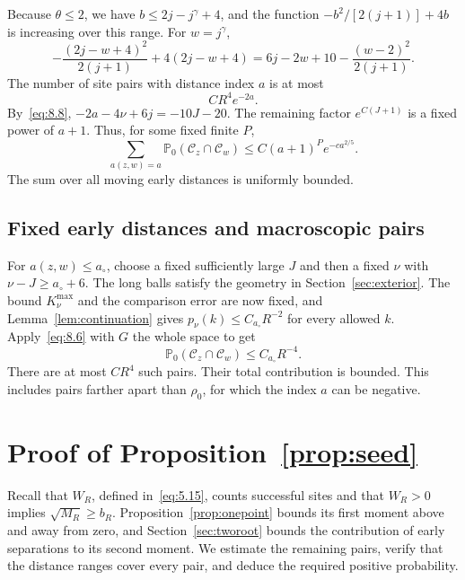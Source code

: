 \documentclass[11pt,letterpaper,reqno]{amsart}
\numberwithin{equation}{section}
\theoremstyle{remark}
\begin{document}
Because $\theta\le2$, we have $b\le2j-j^\gamma+4$, and the function
$-b^2/[2(j+1)]+4b$ is increasing over this range. For $w=j^\gamma$,
\begin{equation}\label{eq:8.25}
-\frac{(2j-w+4)^2}{2(j+1)}+4(2j-w+4)
=6j-2w+10-\frac{(w-2)^2}{2(j+1)}.
\end{equation}
The number of site pairs with distance index $a$ is at most
\begin{equation}\label{eq:8.26}
CR^4e^{-2a}.
\end{equation}
By~\eqref{eq:8.8}, $-2a-4\nu+6j=-10J-20$. The remaining factor $e^{C(J+1)}$ is a fixed power of $a+1$. Thus, for some fixed finite $P$,
\begin{equation}\label{eq:8.27}
\sum_{a(z,w)=a}\mathbb P_0(\mathcal C_z\cap\mathcal C_w)
\le C(a+1)^P e^{-c a^{2/5}}.
\end{equation}
The sum over all moving early distances is uniformly bounded.

\subsection{Fixed early distances and macroscopic pairs}\label{sec:far}
For $a(z,w)\le a_\circ$, choose a fixed sufficiently large $J$ and then a fixed $\nu$ with $\nu-J\ge a_\circ+6$. The long balls satisfy the geometry in Section~\ref{sec:exterior}. The bound $K_\nu^{\max}$ and the comparison error are now fixed, and Lemma~\ref{lem:continuation} gives
$p_\nu(k)\le C_{a_\circ}R^{-2}$ for every allowed $k$. Apply~\eqref{eq:8.6} with $G$ the whole space to get
\begin{equation}\label{eq:8.28}
\mathbb P_0(\mathcal C_z\cap\mathcal C_w)
\le C_{a_\circ}R^{-4}.
\end{equation}
There are at most $CR^4$ such pairs. Their total contribution is bounded. This includes pairs farther apart than $\rho_0$, for which the index $a$ can be negative.


\section{Proof of Proposition~\ref{prop:seed}}\label{sec:second}
Recall that $W_R$, defined in~\eqref{eq:5.15}, counts successful sites and that $W_R>0$ implies $\sqrt{M_R}\ge b_R$. Proposition~\ref{prop:onepoint} bounds its first moment above and away from zero, and Section~\ref{sec:tworoot} bounds the contribution of early separations to its second moment. We estimate the remaining pairs, verify that the distance ranges cover every pair, and deduce the required positive probability.
\end{document}
